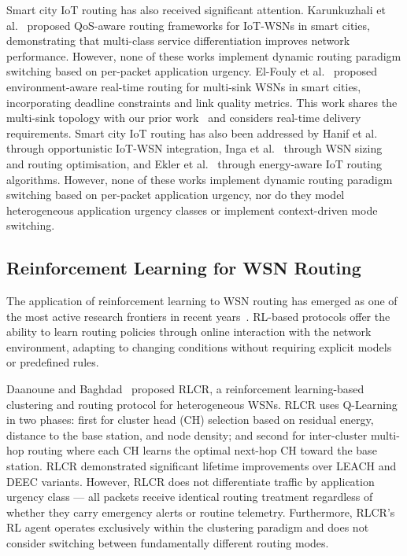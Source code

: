 \documentclass[12pt]{article}
\begin{document}
Smart city IoT routing has also received significant attention.
Karunkuzhali et al.~\cite{karunkuzhali_oqr-sc_2022,karunkuzhali_qos-aware_2024}
proposed QoS-aware routing frameworks for IoT-WSNs in smart cities,
demonstrating that multi-class service differentiation improves
network performance. However, none of these works implement dynamic
routing paradigm switching based on per-packet application urgency.
El-Fouly et al.~\cite{el-fouly_environment-aware_2023} proposed
environment-aware real-time routing for multi-sink WSNs in smart
cities, incorporating deadline constraints and link quality metrics.
This work shares the multi-sink topology with our prior
work~\cite{salman2023} and considers real-time delivery requirements. Smart city IoT routing has also been addressed by Hanif
et al.~\cite{hanif_opportunistically_2018} through opportunistic
IoT-WSN integration, Inga et al.~\cite{inga_novel_2021} through WSN
sizing and routing optimisation, and Ekler
et al.~\cite{ekler_energy_2022} through energy-aware IoT routing
algorithms. However, none of these works implement dynamic routing
paradigm switching based on per-packet application urgency, nor do they model heterogeneous application urgency classes or implement context-driven mode switching.

\subsection{Reinforcement Learning for WSN Routing}

The application of reinforcement learning to WSN routing has emerged
as one of the most active research frontiers in recent
years~\cite{priyadarshi_energy-efficient_2024,priyadarshi_ai-based_2025,yilmaz_sustainable_2025}.
RL-based protocols offer the ability to learn routing policies
through online interaction with the network environment, adapting
to changing conditions without requiring explicit models or
predefined rules.

Daanoune and Baghdad~\cite{daanoune_intelligent_2026} proposed RLCR, a
reinforcement learning-based clustering and routing protocol for
heterogeneous WSNs. RLCR uses Q-Learning in two phases: first for
cluster head (CH) selection based on residual energy, distance to the
base station, and node density; and second for inter-cluster multi-hop
routing where each CH learns the optimal next-hop CH toward the base
station. RLCR demonstrated significant lifetime improvements over
LEACH and DEEC variants. However, RLCR does not differentiate traffic
by application urgency class --- all packets receive identical
routing treatment regardless of whether they carry emergency alerts
or routine telemetry. Furthermore, RLCR's RL agent operates
exclusively within the clustering paradigm and does not consider
switching between fundamentally different routing modes.
\end{document}
